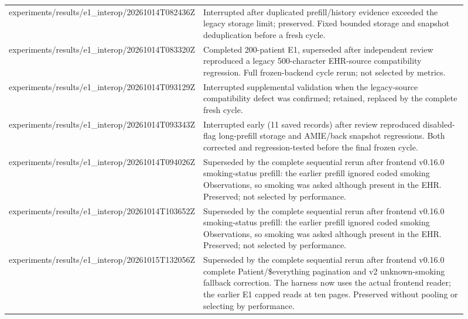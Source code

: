 \begin{longtable}{>{\raggedright\arraybackslash}p{0.31\linewidth}>{\raggedright\arraybackslash}p{0.6\linewidth}}
experiments/\allowbreak{}results/\allowbreak{}e1\_\allowbreak{}interop/\allowbreak{}20261014T082436Z & Interrupted after duplicated prefill/\allowbreak{}history evidence exceeded the legacy storage limit; preserved.\allowbreak{} Fixed bounded storage and snapshot deduplication before a fresh cycle.\allowbreak{} \\
experiments/\allowbreak{}results/\allowbreak{}e1\_\allowbreak{}interop/\allowbreak{}20261014T083320Z & Completed 200-\allowbreak{}patient E1, superseded after independent review reproduced a legacy 500-\allowbreak{}character EHR-\allowbreak{}source compatibility regression.\allowbreak{} Full frozen-\allowbreak{}backend cycle rerun; not selected by metrics.\allowbreak{} \\
experiments/\allowbreak{}results/\allowbreak{}e1\_\allowbreak{}interop/\allowbreak{}20261014T093129Z & Interrupted supplemental validation when the legacy-\allowbreak{}source compatibility defect was confirmed; retained, replaced by the complete fresh cycle.\allowbreak{} \\
experiments/\allowbreak{}results/\allowbreak{}e1\_\allowbreak{}interop/\allowbreak{}20261014T093343Z & Interrupted early (11 saved records) after review reproduced disabled-\allowbreak{}flag long-\allowbreak{}prefill storage and AMIE/\allowbreak{}back snapshot regressions.\allowbreak{} Both corrected and regression-\allowbreak{}tested before the final frozen cycle.\allowbreak{} \\
experiments/\allowbreak{}results/\allowbreak{}e1\_\allowbreak{}interop/\allowbreak{}20261014T094026Z & Superseded by the complete sequential rerun after frontend v0.\allowbreak{}16.\allowbreak{}0 smoking-\allowbreak{}status prefill:\allowbreak{} the earlier prefill ignored coded smoking Observations, so smoking was asked although present in the EHR.\allowbreak{} Preserved; not selected by performance.\allowbreak{} \\
experiments/\allowbreak{}results/\allowbreak{}e1\_\allowbreak{}interop/\allowbreak{}20261014T103652Z & Superseded by the complete sequential rerun after frontend v0.\allowbreak{}16.\allowbreak{}0 smoking-\allowbreak{}status prefill:\allowbreak{} the earlier prefill ignored coded smoking Observations, so smoking was asked although present in the EHR.\allowbreak{} Preserved; not selected by performance.\allowbreak{} \\
experiments/\allowbreak{}results/\allowbreak{}e1\_\allowbreak{}interop/\allowbreak{}20261015T132056Z & Superseded by the complete sequential rerun after frontend v0.\allowbreak{}16.\allowbreak{}0 complete Patient/\allowbreak{}\$everything pagination and v2 unknown-\allowbreak{}smoking fallback correction.\allowbreak{} The harness now uses the actual frontend reader; the earlier E1 capped reads at ten pages.\allowbreak{} Preserved without pooling or selecting by performance.\allowbreak{} \\

\end{longtable}
